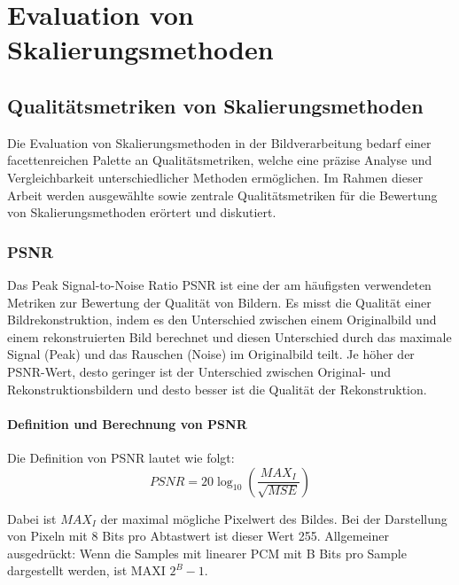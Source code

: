 

\chapter{Evaluation von Skalierungsmethoden}

\section{Qualitätsmetriken von Skalierungsmethoden}

    Die Evaluation von Skalierungsmethoden in der Bildverarbeitung bedarf einer facettenreichen Palette an Qualitätsmetriken, welche eine präzise Analyse und Vergleichbarkeit unterschiedlicher Methoden ermöglichen. 
    Im Rahmen dieser Arbeit werden ausgewählte sowie zentrale Qualitätsmetriken für die Bewertung von Skalierungsmethoden erörtert und diskutiert.

    \subsection{\ac{PSNR}}
        Das Peak Signal-to-Noise Ratio \ac{PSNR} ist eine der am häufigsten verwendeten Metriken zur Bewertung der Qualität von Bildern.
        Es misst die Qualität einer Bildrekonstruktion, indem es den Unterschied zwischen einem Originalbild und einem rekonstruierten Bild berechnet und diesen Unterschied durch das maximale Signal (Peak) und das Rauschen (Noise) im Originalbild teilt. 
        Je höher der PSNR-Wert, desto geringer ist der Unterschied zwischen Original- und Rekonstruktionsbildern und desto besser ist die Qualität der Rekonstruktion.
        
        \subsubsection{Definition und Berechnung von \ac{PSNR}}
            Die Definition von PSNR lautet wie folgt:
            \begin{equation}
            PSNR = 20 \log_{10} \left( \frac{MAX_I}{\sqrt{MSE}} \right)
            \end{equation}

            Dabei ist $MAX_I$ der maximal mögliche Pixelwert des Bildes.
            Bei der Darstellung von Pixeln mit 8 Bits pro Abtastwert ist dieser Wert 255.
            Allgemeiner ausgedrückt: Wenn die Samples mit linearer PCM mit B Bits pro Sample dargestellt werden, ist MAXI $2^B - 1$.

